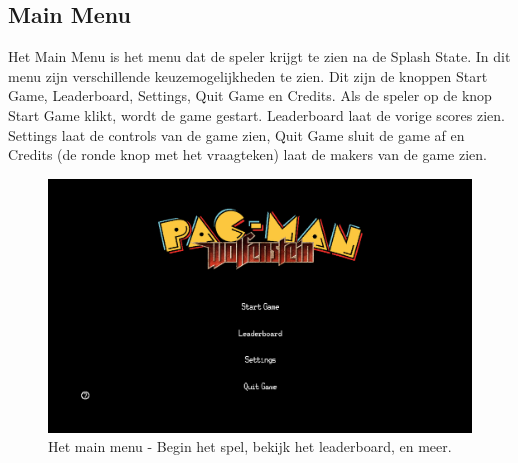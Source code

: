 \documentclass{report}
\begin{document}
    \subsection{Main Menu} %
    \label{sub:main_menu}
    Het Main Menu is het menu dat de speler krijgt te zien na de Splash State. In dit menu zijn verschillende keuzemogelijkheden te zien. Dit zijn de knoppen Start Game, Leaderboard, Settings, Quit Game en Credits. Als de speler op de knop Start Game klikt, wordt de game gestart. Leaderboard laat de vorige scores zien. Settings laat de controls van de game zien, Quit Game sluit de game af en Credits (de ronde knop met het vraagteken) laat de makers van de game zien.
    \begin{figure}[!ht]
      \centering
      \includegraphics[width=.95\textwidth]{technisch verslag imgs/main.png}
      \caption{Het main menu - Begin het spel, bekijk het leaderboard, en meer.}
    \end{figure}
\end{document}
